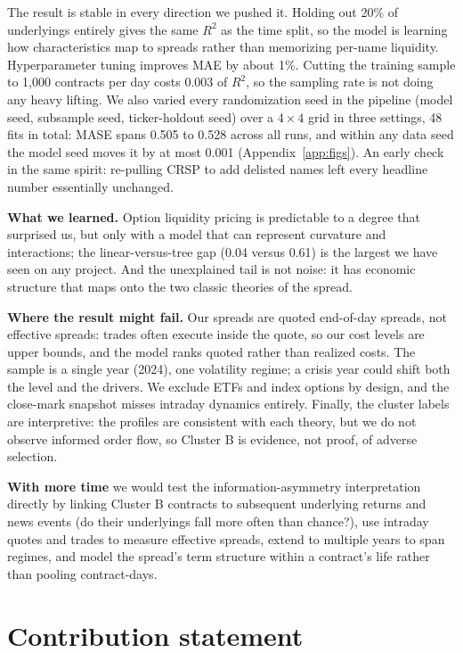 \documentclass[11pt]{article}
\begin{document}
The result is stable in every direction we pushed it. Holding out 20\% of
underlyings entirely gives the same $R^2$ as the time split, so the model is
learning how characteristics map to spreads rather than memorizing per-name
liquidity. Hyperparameter tuning improves MAE by about 1\%. Cutting the
training sample to 1,000 contracts per day costs 0.003 of $R^2$, so the
sampling rate is not doing any heavy lifting. We also varied every
randomization seed in the pipeline (model seed, subsample seed, ticker-holdout
seed) over a $4 \times 4$ grid in three settings, 48 fits in total: MASE
spans 0.505 to 0.528 across all runs, and within any data seed the model seed
moves it by at most 0.001 (Appendix~\ref{app:figs}). An early check in the
same spirit: re-pulling CRSP to add delisted names left every headline number
essentially unchanged.

\textbf{What we learned.} Option liquidity pricing is predictable to a degree
that surprised us, but only with a model that can represent curvature and
interactions; the linear-versus-tree gap (0.04 versus 0.61) is the largest we
have seen on any project. And the unexplained tail is not noise: it has
economic structure that maps onto the two classic theories of the spread.

\textbf{Where the result might fail.} Our spreads are quoted end-of-day
spreads, not effective spreads: trades often execute inside the quote, so our
cost levels are upper bounds, and the model ranks quoted rather than realized
costs. The sample is a single year (2024), one volatility regime; a crisis
year could shift both the level and the drivers. We exclude ETFs and index
options by design, and the close-mark snapshot misses intraday dynamics
entirely. Finally, the cluster labels are interpretive: the profiles are
consistent with each theory, but we do not observe informed order flow, so
Cluster B is evidence, not proof, of adverse selection.

\textbf{With more time} we would test the information-asymmetry
interpretation directly by linking Cluster B contracts to subsequent
underlying returns and news events (do their underlyings fall more often than
chance?), use intraday quotes and trades to measure effective spreads, extend
to multiple years to span regimes, and model the spread's term structure
within a contract's life rather than pooling contract-days.

\section{Contribution statement}
\end{document}

